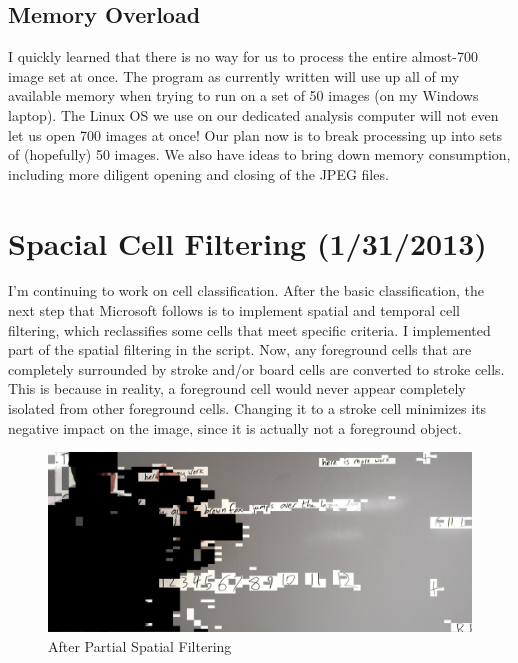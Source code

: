 \documentclass[]{article}
\begin{document}
	\subsection*{Memory Overload}
	I quickly learned that there is no way for us to process the entire almost-700 image set at once.  The program as currently written will use up all of my available memory when trying to run on a set of 50 images (on my Windows laptop).  The Linux OS we use on our dedicated analysis computer will not even let us open 700 images at once!  Our plan now is to break processing up into sets of (hopefully) 50 images.  We also have ideas to bring down memory consumption, including more diligent opening and closing of the JPEG files.



	\section{Spacial Cell Filtering (1/31/2013)}	
		I'm continuing to work on cell classification.  After the basic classification, the next step that Microsoft follows is to implement spatial and temporal cell filtering, which reclassifies some cells that meet specific criteria.  I implemented part of the spatial filtering in the script.  Now, any foreground cells that are completely surrounded by stroke and/or board cells are converted to stroke cells.  This is because in reality, a foreground cell would never appear completely isolated from other foreground cells.  Changing it to a stroke cell minimizes its negative impact on the image, since it is actually not a foreground object.  
\begin{figure}[H]
\centering
\includegraphics[scale=0.2]{images/afterSpatial1}
\caption{After Partial Spatial Filtering}
\end{figure}
		
\end{document}
